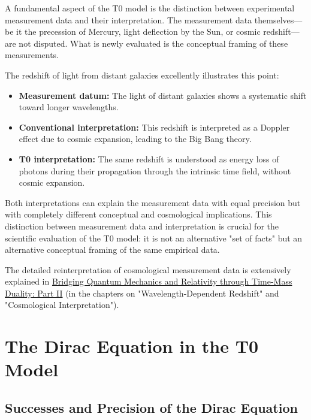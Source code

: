 \documentclass[12pt,a4paper]{article}
\begin{document}
	A fundamental aspect of the T0 model is the distinction between experimental measurement data and their interpretation. The measurement data themselves—be it the precession of Mercury, light deflection by the Sun, or cosmic redshift—are not disputed. What is newly evaluated is the conceptual framing of these measurements.
	
	The redshift of light from distant galaxies excellently illustrates this point:
	
	\begin{itemize}
		\item \textbf{Measurement datum:} The light of distant galaxies shows a systematic shift toward longer wavelengths.
		
		\item \textbf{Conventional interpretation:} This redshift is interpreted as a Doppler effect due to cosmic expansion, leading to the Big Bang theory.
		
		\item \textbf{T0 interpretation:} The same redshift is understood as energy loss of photons during their propagation through the intrinsic time field, without cosmic expansion.
	\end{itemize}
	
	Both interpretations can explain the measurement data with equal precision but with completely different conceptual and cosmological implications. This distinction between measurement data and interpretation is crucial for the scientific evaluation of the T0 model: it is not an alternative "set of facts" but an alternative conceptual framing of the same empirical data.
	
	The detailed reinterpretation of cosmological measurement data is extensively explained in \href{https://github.com/jpascher/T0-Time-Mass-Duality/tree/main/2/pdf/English/QMRelTimeMassPart2En.pdf}{Bridging Quantum Mechanics and Relativity through Time-Mass Duality: Part II} (in the chapters on "Wavelength-Dependent Redshift" and "Cosmological Interpretation").
	
	\section{The Dirac Equation in the T0 Model}
	\label{sec:dirac_equation}
	
	\subsection{Successes and Precision of the Dirac Equation}
	\label{subsec:dirac_success}
	
\end{document}
